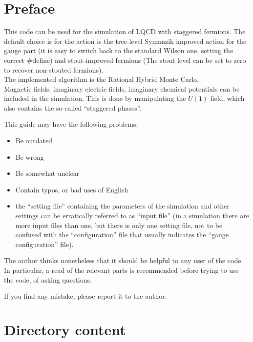 
\newpage
\section*{Preface}

This code can be used for the simulation of LQCD with staggered fermions.
The default choice is for the action is the tree-level Symanzik improved 
action for the gauge part (it is easy to switch back to the standard Wilson one,
setting the correct \#define) and stout-improved fermions (The stout level can be 
set to zero to recover non-stouted fermions).  \\
The implemented algorithm is the Rational Hybrid Monte Carlo. \\
Magnetic fields, imaginary electric fields, imaginary chemical potentials can be 
included in the simulation. This is done by manipulating the $U(1)$ field, which 
also contains the so-called ``staggered phases''.

This guide may have the following problems:
\begin{itemize}
 \item Be outdated
 \item Be wrong
 \item Be somewhat unclear
 \item Contain typos, or bad uses of English 
 \item the ``setting file'' containing the parameters of the simulation
 and other settings can be erratically referred to as ``input file'' 
 (in a simulation there are more input files than one, but there is only one setting file,
 not to be confused with the ``configuration'' file that usually indicates the ``gauge configuration'' file).
\end{itemize}
The author thinks nonetheless that it should be helpful to any user of the code.
In particular, a read of the relevant parts is recommended before trying to use the code,
of asking questions.

If you find any mistake, please report it to the author.

\newpage
\tableofcontents

\newpage
\section{Directory content}

